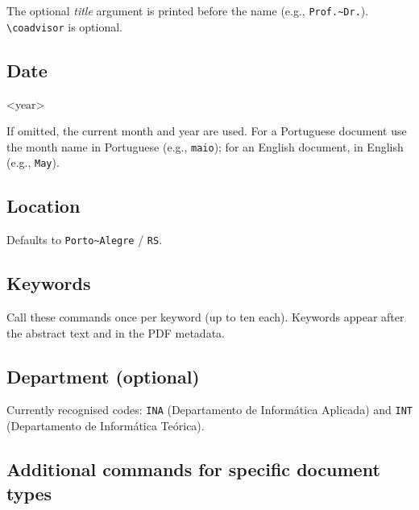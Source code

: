 \documentclass[11pt,a4paper]{article}
\newcommand{\opt}[1]{\texttt{#1}}
\newcommand{\cmd}[1]{\texttt{\textbackslash #1}}
\newcommand{\meta}[1]{\textit{\textlangle#1\textrangle}}
\begin{document}
The optional \meta{title} argument is printed before the name
(e.g., \texttt{Prof.\textasciitilde Dr.}).  \cmd{coadvisor} is optional.

\subsection{Date}

\begin{latex}
\date{<month>}{<year>}
\end{latex}

If omitted, the current month and year are used.
For a Portuguese document use the month name in Portuguese
(e.g., \texttt{maio}); for an English document, in English
(e.g., \texttt{May}).

\subsection{Location}

\begin{latex}
\end{latex}

Defaults to \texttt{Porto\textasciitilde Alegre} / \texttt{RS}.

\subsection{Keywords}

\begin{latex}
\end{latex}

Call these commands once per keyword (up to ten each).  Keywords appear
after the abstract text and in the PDF metadata.

\subsection{Department (optional)}

\begin{latex}
\end{latex}

Currently recognised codes: \opt{INA} (Departamento de Informática
Aplicada) and \opt{INT} (Departamento de Informática Teórica).

\subsection{Additional commands for specific document types}
\end{document}
